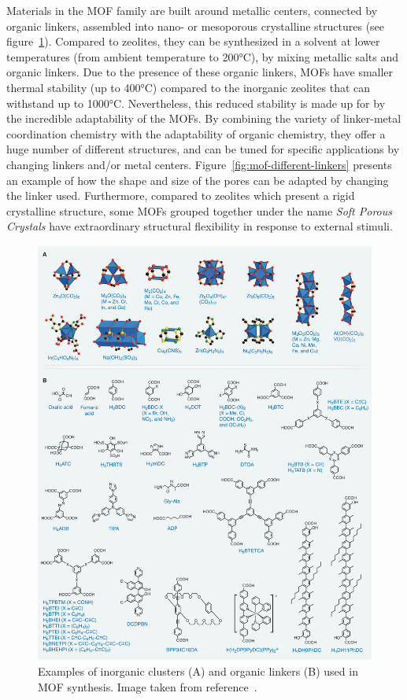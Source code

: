 \documentclass[thesis]{subfiles}
\begin{document}
Materials in the MOF family are built around metallic centers, connected by
organic linkers, assembled into nano- or mesoporous crystalline structures (see
figure~\ref{fig:mof-building-blocks}). Compared to zeolites, they can be
synthesized in a solvent at lower temperatures (from ambient temperature to
200°C), by mixing metallic salts and organic linkers. Due to the presence of
these organic linkers, MOFs have smaller thermal stability (up to 400°C)
compared to the inorganic zeolites that can withstand up to 1000°C.
Nevertheless, this reduced stability is made up for by the incredible
adaptability of the MOFs. By combining the variety of linker-metal coordination chemistry
with the adaptability of organic chemistry, they offer a huge number of
different structures, and can be tuned for specific applications by changing
linkers and/or metal centers. Figure~\ref{fig:mof-different-linkers} presents an
example of how the shape and size of the pores can be adapted by changing the
linker used. Furthermore, compared to zeolites which present a rigid crystalline
structure, some MOFs grouped together under the name \emph{Soft Porous
Crystals}\cite{Horike2009} have extraordinary structural flexibility in
response to external stimuli\cite{Kitagawa2005, Bradshaw2005, Coudert2015}.

\begin{figure}[p]
    \centering
    \includegraphics[width=\textwidth]{figures/cited/mof-building-blocks}
    \caption{Examples of inorganic clusters (A) and organic linkers (B) used in
    MOF synthesis. Image taken from reference~\cite{Furukawa2013}.}
    \label{fig:mof-building-blocks}
\end{figure}
\end{document}
